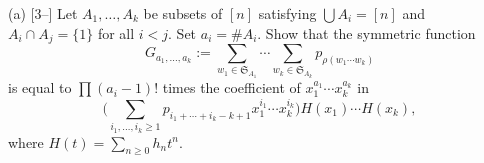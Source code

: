 (a) [$3$--] Let $A_1,\ldots,A_k$ be subsets of $[n]$ satisfying $\bigcup A_i=[n]$ and $A_i\cap A_j=\{1\}$ for all $i<j$. Set $a_i=\#A_i$. Show that the symmetric function
\[
G_{a_1,\ldots,a_k} := \sum_{w_1\in\mathfrak{S}_{A_1}}\cdots\sum_{w_k\in\mathfrak{S}_{A_k}} p_{\rho(w_1\cdots w_k)} \tag{15}
\]
is equal to $\prod (a_i-1)!$ times the coefficient of $x_1^{a_1}\cdots x_k^{a_k}$ in
\[
\Big(\sum_{i_1,\ldots,i_k\ge 1} p_{i_1+\cdots+i_k-k+1}x_1^{i_1}\cdots x_k^{i_k}\Big)H(x_1)\cdots H(x_k),
\]
where $H(t)=\sum_{n\ge 0}h_nt^n$.
